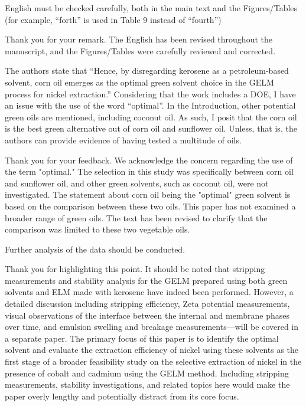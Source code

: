 \documentclass[11pt,answers]{exam}
\begin{document}
\begin{questions}
\question English must be checked carefully, both in the main text and the Figures/Tables (for example, “forth” is used in Table 9 instead of “fourth”)
 \begin{solutionorbox}[5.5cm]
Thank you for your remark. The English has been revised throughout the manuscript, and the Figures/Tables were carefully reviewed and corrected. 
 \end{solutionorbox}

\question The authors state that “Hence, by disregarding
kerosene as a petroleum-based solvent, corn oil emerges as the optimal green solvent choice in the
GELM process for nickel extraction.” Considering that the work includes a DOE, I have an issue
with the use of the word “optimal”. In the Introduction, other potential green oils are mentioned,
including coconut oil. As such, I posit that the corn oil is the best green alternative out of corn oil
and sunflower oil. Unless, that is, the authors can provide evidence of having tested a multitude
of oils. 

 \begin{solutionorbox}[5.5cm]
 
 Thank you for your feedback. We acknowledge the concern regarding the use of the term "optimal." The selection in this study was specifically between corn oil and sunflower oil, and other green solvents, such as coconut oil, were not investigated. The statement about corn oil being the "optimal" green solvent is based on the comparison between these two oils. This paper has not examined a broader range of green oils. The text has been revised to clarify that the comparison was limited to these two vegetable oils.
 
 \end{solutionorbox}

\question Further analysis of the data should be conducted.

 \begin{solutionorbox}[5.5cm]

Thank you for highlighting this point. It should be noted that stripping measurements and stability analysis for the GELM prepared using both green solvents and ELM made with kerosene have indeed been performed. However, a detailed discussion including stripping efficiency, Zeta potential measurements, visual observations of the interface between the internal and membrane phases over time, and emulsion swelling and breakage measurements—will be covered in a separate paper. The primary focus of this paper is to identify the optimal solvent and evaluate the extraction efficiency of nickel using these solvents as the first stage of a broader feasibility study on the selective extraction of nickel in the presence of cobalt and cadmium using the GELM method. Including stripping measurements, stability investigations, and related topics here would make the paper overly lengthy and potentially distract from its core focus.


\end{solutionorbox}
\end{questions}
\end{document}
